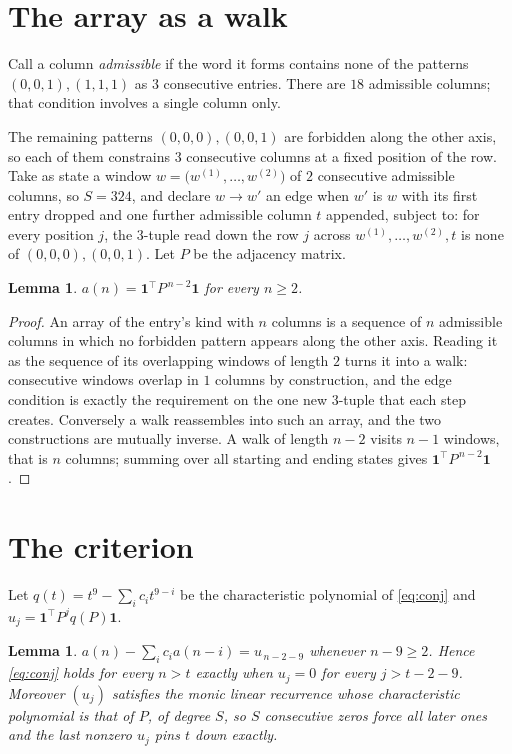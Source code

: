 \documentclass[11pt,a4paper]{article}
\theoremstyle{plain}
\newtheorem{lemma}[theorem]{Lemma}
\theoremstyle{definition}
\begin{document}
\section{The array as a walk}

Call a column \emph{admissible} if the word it forms contains none of the patterns
$(0,0,1), (1,1,1)$ as $3$ consecutive entries. There are $18$ admissible columns; that condition
involves a single column only.

The remaining patterns $(0,0,0), (0,0,1)$ are forbidden along the other axis, so each of them
constrains $3$ consecutive columns at a fixed position of the row. Take as state a
window $w=\bigl(w^{(1)},\dots,w^{(2)}\bigr)$ of $2$ consecutive admissible
columns, so $S=324$, and declare $w\to w'$ an edge when $w'$ is $w$ with its first entry
dropped and one further admissible column $t$ appended, subject to: for every position
$j$, the $3$-tuple read down the row $j$ across $w^{(1)},\dots,w^{(2)},t$
is none of $(0,0,0), (0,0,1)$. Let $P$ be the adjacency matrix.

\begin{lemma}\label{lem:walk}
$a(n)=\mathbf{1}^{\!\top}P^{\,n-2}\mathbf{1}$ for every $n\ge2$.
\end{lemma}

\begin{proof}
An array of the entry's kind with $n$ columns is a sequence of $n$ admissible columns in
which no forbidden pattern appears along the other axis. Reading it as the sequence of its
overlapping windows of length $2$ turns it into a walk: consecutive windows overlap in
$1$ columns by construction, and the edge condition is exactly the requirement on the one
new $3$-tuple that each step creates. Conversely a walk reassembles into such an array,
and the two constructions are mutually inverse. A walk of length $n-2$ visits $n-1$
windows, that is $n$ columns; summing over all starting and ending states gives
$\mathbf{1}^{\!\top}P^{\,n-2}\mathbf{1}$.
\end{proof}

\section{The criterion}

Let $q(t)=t^{9}-\sum_i c_i t^{9-i}$ be the characteristic polynomial of
\eqref{eq:conj} and $u_j=\mathbf{1}^{\!\top}P^{j}q(P)\mathbf{1}$.

\begin{lemma}\label{lem:crit}
$a(n)-\sum_i c_i a(n-i)=u_{\,n-2-9}$ whenever $n-9\ge2$. Hence
\eqref{eq:conj} holds for every $n>t$ exactly when $u_j=0$ for every
$j>t-2-9$. Moreover $(u_j)$ satisfies the monic linear recurrence whose
characteristic polynomial is that of $P$, of degree $S$, so $S$ consecutive zeros force all
later ones and the last nonzero $u_j$ pins $t$ down exactly.
\end{lemma}
\end{document}
